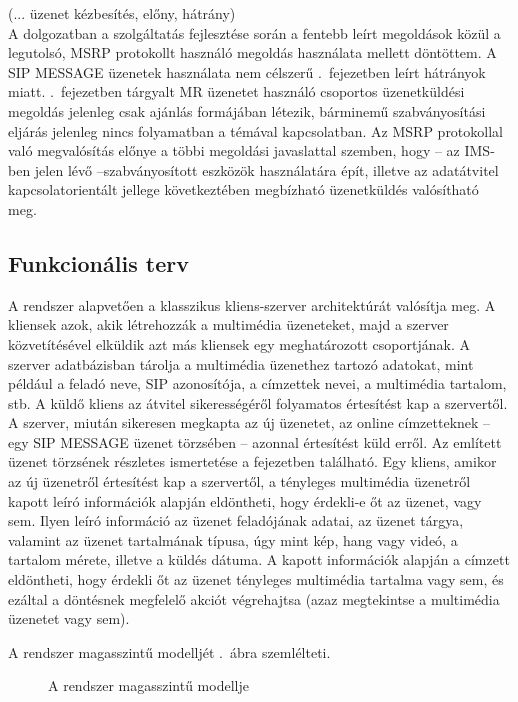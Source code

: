 {\color{red} (... üzenet kézbesítés, előny, hátrány)}
\\
A dolgozatban a szolgáltatás fejlesztése során a fentebb leírt megoldások közül a legutolsó, MSRP protokollt használó megoldás használata mellett döntöttem. A SIP MESSAGE üzenetek használata nem célszerű .~fejezetben leírt hátrányok miatt. .~fejezetben tárgyalt MR üzenetet használó csoportos üzenetküldési megoldás jelenleg csak ajánlás formájában létezik, bárminemű szabványosítási eljárás jelenleg nincs folyamatban a témával kapcsolatban. Az MSRP protokollal való megvalósítás előnye a többi megoldási javaslattal szemben, hogy -- az IMS-ben jelen lévő --szabványosított eszközök használatára épít, illetve az adatátvitel kapcsolatorientált jellege következtében megbízható üzenetküldés valósítható meg. 

\subsection{Funkcionális terv}

A rendszer alapvetően a klasszikus kliens-szerver architektúrát valósítja meg. A kliensek azok, akik létrehozzák a multimédia üzeneteket, majd a szerver közvetítésével elküldik azt más kliensek egy meghatározott csoportjának. A szerver adatbázisban tárolja a multimédia üzenethez tartozó adatokat, mint például a feladó neve, SIP azonosítója, a címzettek nevei, a multimédia tartalom, stb. A küldő kliens az átvitel sikerességéről folyamatos értesítést kap a szervertől. A szerver, miután sikeresen megkapta az új üzenetet, az online címzetteknek -- egy SIP MESSAGE üzenet törzsében -- azonnal értesítést küld erről. Az említett üzenet törzsének részletes ismertetése a  fejezetben található. Egy kliens, amikor az új üzenetről értesítést kap a szervertől, a tényleges multimédia üzenetről kapott leíró információk alapján eldöntheti, hogy érdekli-e őt az üzenet, vagy sem. Ilyen leíró információ az üzenet feladójának adatai, az üzenet tárgya, valamint az üzenet tartalmának típusa, úgy mint kép, hang vagy videó, a tartalom mérete, illetve a küldés dátuma. A kapott információk alapján a címzett eldöntheti, hogy érdekli őt az üzenet tényleges multimédia tartalma vagy sem, és ezáltal a döntésnek megfelelő akciót végrehajtsa (azaz megtekintse a multimédia üzenetet vagy sem). 

A rendszer magasszintű modelljét .~ábra szemlélteti.

\begin{figure}[htbp]
\center
{}
\caption{A rendszer magasszintű modellje}
\label{fig:model}
\end{figure}

